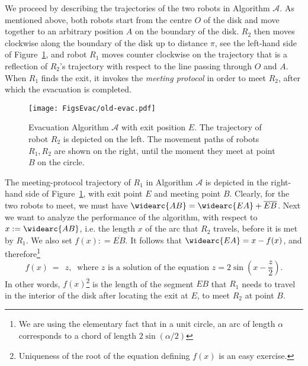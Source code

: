 \documentclass[
final
]{dmtcs-episciences}
\newcommand{\sinn}[1]{\sin \left({#1}\right)}
\newcommand{\RA}{\ensuremath{R_1}}
\newcommand{\RB}{\ensuremath{R_2 }}
\newcommand{\arccc}[1]{
\widearc{#1}
}
\theoremstyle{definition}
\begin{document}
We proceed by describing the trajectories of the two robots in Algorithm  
$\mathcal A$. As mentioned above, both robots start 
from the centre $O$ of the disk and move together to an arbitrary position $A$ on the 
boundary of the disk. $\RB$ then moves clockwise along the boundary of the disk up to distance $\pi$, see the
left-hand side of Figure~\ref{fig: old-algo}, and robot $\RA$ moves counter clockwise on the trajectory that is a reflection of $\RB$'s trajectory with respect to the 
line passing through $O$ and $A$. When $\RA$ finds the exit, it invokes the  {\it meeting protocol} in order to meet  $\RB$, after which the evacuation is completed. 



\begin{figure}[!ht]
                \centering
                \texttt{[image: FigsEvac/old-evac.pdf]}
				\caption{Evacuation Algorithm $\mathcal A$ with exit position $E$.  
				The trajectory of robot $\RB$ is depicted on the left. 
				The movement paths of robots $\RA,\RB$ are shown on the right, until the moment they meet at point $B$ on the circle. 
}
                \label{fig: old-algo}
\end{figure}




The meeting-protocol trajectory of $\RA$ in Algorithm $\mathcal A$ is depicted in the right-hand side of Figure~\ref{fig: old-algo}, with exit point $E$ and meeting point $B$. 
Clearly, for the two robots to meet, we must have $\arccc{AB}=\arccc{EA}+\overline{EB}$. Next we want to analyze the performance of the algorithm, with respect to $x:=\arccc{AB}$, i.e. the length $x$ of the arc that $\RB$ travels, before it is met by $\RA$. We also set $f(x): = \overline{EB}$.
It follows that $\arccc{EA}=x-f(x)$, and therefore\footnote{We are using the elementary fact that in a unit circle, an arc of length $\alpha$ corresponds to a chord of length $2\sinn{\alpha/2}$}
\begin{equation}\label{equa: def f}
f(x)~=~ ~z,~ \textrm{ where }z \textrm{ is a solution of the equation } 
z= 2\sinn{x-\frac z2}.
\end{equation}
In other words,  $f(x)$\footnote{Uniqueness of the root of the equation defining $f(x)$ is an easy exercise.} 
is the length of the segment $EB$ that $\RA$ 
needs to travel in the interior of the disk after locating the exit at $E$, 
to meet $\RB$ at point $B$. 
\end{document}
